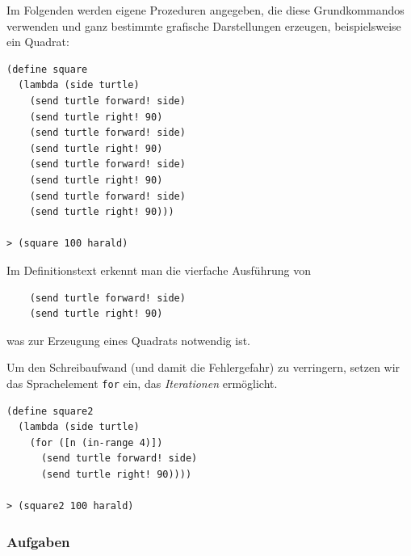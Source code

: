 \documentclass[12pt,a4paper]{scrartcl}
\begin{document}
Im Folgenden werden eigene Prozeduren angegeben, die diese Grundkommandos verwenden und ganz bestimmte grafische Darstellungen erzeugen, beispielsweise ein Quadrat:

\begin{verbatim}
(define square
  (lambda (side turtle)
    (send turtle forward! side)
    (send turtle right! 90)
    (send turtle forward! side)
    (send turtle right! 90)
    (send turtle forward! side)
    (send turtle right! 90)
    (send turtle forward! side)
    (send turtle right! 90)))

> (square 100 harald)
\end{verbatim}

Im Definitionstext erkennt man die vierfache Ausführung von
\begin{verbatim}
    (send turtle forward! side)
    (send turtle right! 90)
\end{verbatim}
was zur Erzeugung eines Quadrats notwendig ist.

Um den Schreibaufwand (und damit die Fehlergefahr) zu verringern, setzen wir das Sprachelement \texttt{for} ein, das \textit{Iterationen} ermöglicht.
\begin{verbatim}
(define square2
  (lambda (side turtle)
    (for ([n (in-range 4)])
      (send turtle forward! side)
      (send turtle right! 90))))

> (square2 100 harald)
\end{verbatim}


%
%
%

\subsubsection*{Aufgaben}
\end{document}
